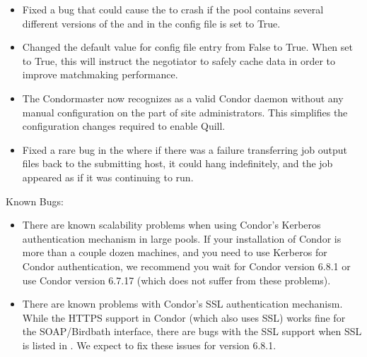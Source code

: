 \begin{itemize}
\item Fixed a bug that could cause the  to crash if the
pool contains several different versions of the  and in the
config file  is set to True.

\item Changed the default value for config file entry
 from False to True.  When set to
True, this will instruct the negotiator to safely cache data in order to
improve matchmaking performance.

\item The Condor{master} now recognizes  as a valid
  Condor daemon without any manual configuration on the part of site
  administrators.
  This simplifies the configuration changes required to enable Quill. 

\item Fixed a rare bug in the  where if there was a
  failure transferring job output files back to the submitting host,
  it could hang indefinitely, and the job appeared as if it was
  continuing to run.

\end{itemize}


\noindent Known Bugs:

\begin{itemize}

\item There are known scalability problems when using Condor's Kerberos
authentication mechanism in large pools.  If your installation of Condor is
more than a couple dozen machines, and you need to use Kerberos for Condor
authentication, we recommend you wait for Condor version 6.8.1 or use Condor
version 6.7.17 (which does not suffer from these problems).

\item There are known problems with Condor's SSL authentication mechanism.
While the HTTPS support in Condor (which also uses SSL) works fine for the
SOAP/Birdbath interface, there are bugs with the SSL support when SSL is
listed in .  We expect to fix
these issues for version 6.8.1.

\end{itemize}

